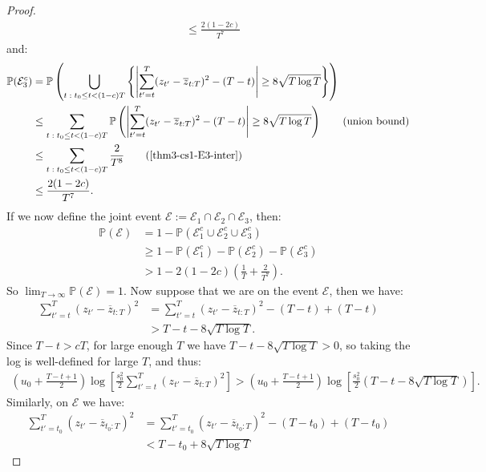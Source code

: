 \documentclass{article}
\begin{document}
\begin{proof}
\begin{align*}
    &\leq \frac{2(1-2c)}{T^7}
\end{align*}
and:
\begin{align*}
    \mathbb{P}(\mathcal{E}^c_3) &= \mathbb{P}\left(\bigcup_{t\;:\; t_0 \leq t < (1-c)T} \left\{\left|\sum_{t'=t}^T (z_{t'} - \overline{z}_{t:T})^2 - (T-t)\right| \geq 8\sqrt{T \log T}\right\}\right) \\
    &\leq \sum_{t\;:\; t_0 \leq t < (1-c)T} \mathbb{P}\left(\left|\sum_{t'=t}^T (z_{t'} - \overline{z}_{t:T})^2 - (T-t)\right| \geq 8\sqrt{T \log T}\right) \tag{union bound}\\
    &\leq \sum_{t\;:\; t_0 \leq t < (1-c)T} \frac{2}{T^8} \tag{\ref{thm3-cs1-E3-inter}}\\
    &\leq \frac{2(1-2c)}{T^7}.
\end{align*}
If we now define the joint event $\mathcal{E} := \mathcal{E}_1 \cap \mathcal{E}_2 \cap \mathcal{E}_3$, then:
\begin{align*}
    \mathbb{P}(\mathcal{E}) &= 1 - \mathbb{P}(\mathcal{E}^c_1 \cup \mathcal{E}^c_2 \cup \mathcal{E}^c_3) \\
    &\geq 1 - \mathbb{P}(\mathcal{E}^c_1 ) - \mathbb{P}(\mathcal{E}^c_2) - \mathbb{P}(\mathcal{E}^c_3)  \tag{union bound} \\
    &> 1 - 2(1-2c)\left(\frac{1}{T} + \frac{2}{T^7}\right).
\end{align*}
So $\lim_{T\to\infty} \mathbb{P}(\mathcal{E})  = 1$. Now suppose that we are on the event $\mathcal{E}$, then we have:
\begin{align*}
    \sum_{t'=t}^T (z_{t'} - \overline{z}_{t:T})^2 &= \sum_{t'=t}^T (z_{t'} - \overline{z}_{t:T})^2 - (T-t) + (T-t) \\
    &> T-t - 8 \sqrt{T \log T}. 
\end{align*}
Since $T-t > cT$, for large enough $T$ we have $T-t - 8 \sqrt{T \log T} > 0$, so taking the log is well-defined for large $T$, and thus:
\begin{align}
    \left(u_0 + \frac{T - t +1}{2}\right)\log\left[ \frac{s_0^2}{2}\sum_{t'=t}^T (z_{t'} - \overline{z}_{t:T})^2 \right]  > \left(u_0 + \frac{T - t +1}{2}\right)\log\left[ \frac{s_0^2}{2} \left(T - t - 8\sqrt{T \log T}\right)\right]. \label{eq:thm3-cs1-bd2}
\end{align}
Similarly, on $\mathcal{E}$ we have:
\begin{align*}
    \sum_{t'=t_0}^T (z_{t'} - \overline{z}_{t_0:T})^2 &= \sum_{t'=t_0}^T (z_{t'} - \overline{z}_{t_0:T})^2 - (T-t_0) + (T-t_0) \\
    &< T-t_0 + 8 \sqrt{T \log T}  

\end{align*}
\end{proof}
\end{document}
